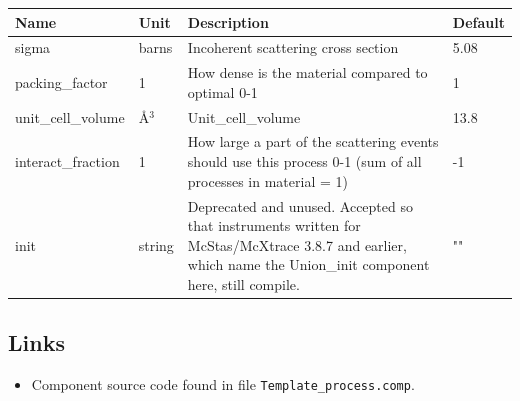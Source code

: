 \begin{longtable}{p{}p{}p{}p{}}
\toprule
\textbf{Name} & \textbf{Unit} & \textbf{Description} & \textbf{Default} \\
\midrule
\endhead
sigma & barns & Incoherent scattering cross section & 5.08 \\
packing\_factor & 1 & How dense is the material compared to optimal 0-1 & 1 \\
unit\_cell\_volume & \AA{}$^{3}$ & Unit\_cell\_volume & 13.8 \\
interact\_fraction & 1 & How large a part of the scattering events should use this process 0-1 (sum of all processes in material = 1) & -1 \\
init & string & Deprecated and unused. Accepted so that instruments written for McStas/McXtrace 3.8.7 and earlier, which name the Union\_init component here, still compile. & "" \\
\bottomrule
\end{longtable}

\subsection*{Links}
\begin{itemize}
  \item Component source code found in file \texttt{Template\_process.comp}.
\end{itemize}
